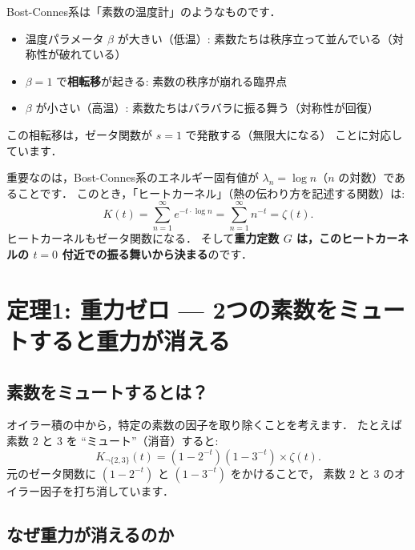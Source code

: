 \documentclass[11pt,a4paper]{article}
\begin{document}
\begin{tcolorbox}[colback=green!5,colframe=green!50!black,title=温度計のたとえ]
Bost-Connes系は「素数の温度計」のようなものです．
\begin{itemize}
  \item 温度パラメータ $\beta$ が大きい（低温）:
    素数たちは秩序立って並んでいる（対称性が破れている）
  \item $\beta = 1$ で\textbf{相転移}が起きる:
    素数の秩序が崩れる臨界点
  \item $\beta$ が小さい（高温）:
    素数たちはバラバラに振る舞う（対称性が回復）
\end{itemize}
この相転移は，ゼータ関数が $s=1$ で発散する（無限大になる）
ことに対応しています．
\end{tcolorbox}

重要なのは，Bost-Connes系のエネルギー固有値が
$\lambda_n = \log n$（$n$ の対数）であることです．
このとき，「ヒートカーネル」（熱の伝わり方を記述する関数）は:
\begin{equation}
  K(t) = \sum_{n=1}^{\infty} e^{-t \cdot \log n}
  = \sum_{n=1}^{\infty} n^{-t} = \zeta(t).
\end{equation}
ヒートカーネルもゼータ関数になる．
そして\textbf{重力定数 $G$ は，このヒートカーネルの
$t=0$ 付近での振る舞いから決まる}のです．

\section{定理1: 重力ゼロ --- 2つの素数をミュートすると重力が消える}

\subsection{素数をミュートするとは？}

オイラー積の中から，特定の素数の因子を取り除くことを考えます．
たとえば素数 $2$ と $3$ を ``ミュート''（消音）すると:
\begin{equation}
  K_{\neg\{2,3\}}(t) = (1 - 2^{-t})(1 - 3^{-t}) \times \zeta(t).
\end{equation}
元のゼータ関数に $(1-2^{-t})$ と $(1-3^{-t})$ をかけることで，
素数 $2$ と $3$ のオイラー因子を打ち消しています．

\subsection{なぜ重力が消えるのか}
\end{document}
